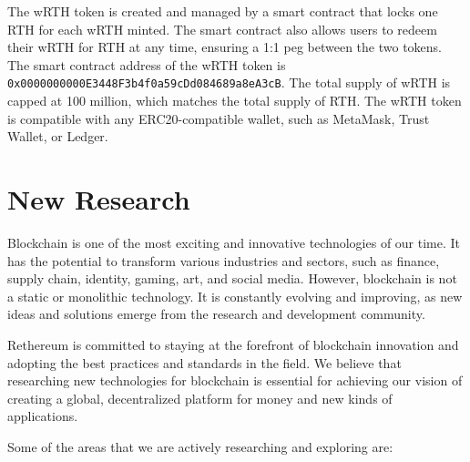 \documentclass[a4paper,onecolumn, superscriptaddress,10pt,accepted=2020-05-01,issue=1, volume=2, shorttitle=papers]{compositionalityarticle}
\begin{document}
\vspace{0.3cm}

The wRTH token is created and managed by a smart contract that locks one RTH for each wRTH minted. The smart contract also allows users to redeem their wRTH for RTH at any time, ensuring a 1:1 peg between the two tokens. The smart contract address of the wRTH token is \texttt{0x0000000000E3448F3b4f0a59cDd084689a8eA3cB}. The total supply of wRTH is capped at 100 million, which matches the total supply of RTH. The wRTH token is compatible with any ERC20-compatible wallet, such as MetaMask, Trust Wallet, or Ledger.

\vspace{1cm}

\section{New Research}

Blockchain is one of the most exciting and innovative technologies of our time. It has the potential to transform various industries and sectors, such as finance, supply chain, identity, gaming, art, and social media. However, blockchain is not a static or monolithic technology. It is constantly evolving and improving, as new ideas and solutions emerge from the research and development community.

Rethereum is committed to staying at the forefront of blockchain innovation and adopting the best practices and standards in the field. We believe that researching new technologies for blockchain is essential for achieving our vision of creating a global, decentralized platform for money and new kinds of applications.

Some of the areas that we are actively researching and exploring are:
\end{document}
